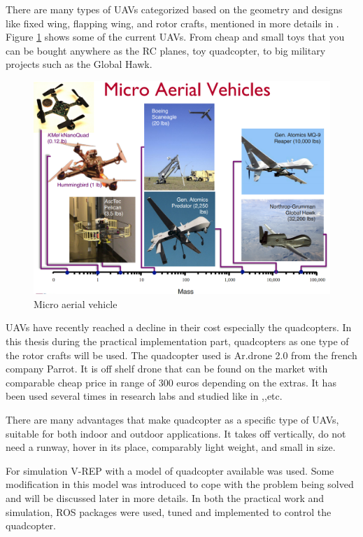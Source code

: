 There are many types of UAVs categorized based on the geometry and designs like fixed wing, flapping wing, and rotor crafts, mentioned in more details in \cite{UAV_general}. Figure \ref{fig:micro_aerial}  shows some of the current UAVs. From cheap and small toys that you can be bought anywhere as the RC planes, toy quadcopter, to big military projects such as the Global Hawk.

\begin{figure}[!htb]
  \includegraphics[width=\linewidth]{figures/Micro_aerial.png}
  \caption{Micro aerial vehicle}\label{fig:micro_aerial} 
  \endminipage\hfill
\end{figure}

 

UAVs have recently reached a decline in their cost especially the quadcopters. In this thesis during the practical implementation part, quadcopters as one type of the rotor crafts will be used. The quadcopter used is Ar.drone 2.0 from the french company Parrot. It is off shelf drone that can be found on the market with comparable cheap price in range of 300 euros depending on the extras. It has been used several times in research labs and studied like in \cite{Ardrone1},\cite{Ardrone2},etc.

There are many advantages that make quadcopter as a specific type of UAVs, suitable for both indoor and outdoor applications. It takes off vertically, do not need a runway, hover in its place, comparably light weight, and small in size.

For simulation V-REP with a model of quadcopter available was used. Some modification in this model was introduced to cope with the problem being solved and will be discussed later in more details. In both the practical work and simulation, ROS packages were used, tuned and implemented to control the quadcopter.

